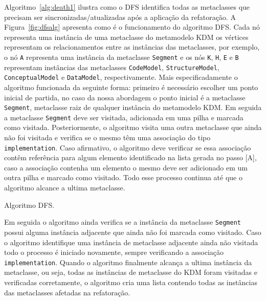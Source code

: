 Algoritmo~\ref{alg:death1} ilustra como o DFS identifica todas as metaclasses que precisam ser sincronizadas/atualizadas após a aplicação da refatoração. A Figura~\ref{fig:dfsalg} apresenta como é o funcionamento do algoritmo DFS. Cada nó representa uma instância de uma metaclasse do metamodelo KDM os vértices representam os relacionamentos entre as instâncias das metaclasses, por exemplo, o nó \texttt{A} representa uma instância da metaclasse \texttt{Segment} e os nós \texttt{K}, \texttt{H}, \texttt{E} e \texttt{B} representam instâncias das metaclasses \texttt{CodeModel}, \texttt{StructureModel}, \texttt{ConceptualModel} e \texttt{DataModel}, respectivamente. Mais especificadamente o algoritmo funcionada da seguinte forma: primeiro é necessário escolher um ponto inicial de partida, no caso da nossa abordagem o ponto inicial é a metaclasse \texttt{Segment}, metaclasse raiz de qualquer instância do metamodelo KDM. Em seguida a metaclasse \texttt{Segment} deve ser visitada, adicionada em uma pilha e marcada como visitada. Posteriormente, o algoritmo visita uma outra metaclasse que ainda não foi visitada e verifica se o mesmo têm uma associação do tipo \texttt{implementation}. Caso afirmativo, o algoritmo deve verificar se essa associação contêm referência para algum elemento identificado na lista gerada no passo [A], caso a associação contenha um elemento o mesmo deve ser adicionado em um outra pilha e marcado como visitado. Todo esse processo continua até que o algoritmo alcance a ultima metaclasse. 



\begin{algoritmo}[h]
     \SetAlgoLined
     \caption{Algoritmo DFS.}
     \label{alg:death1}
   \end{algoritmo}

Em seguida o algoritmo ainda verifica se a instância da metaclasse \texttt{Segment} possui alguma instância adjacente que ainda não foi marcada como visitado. Caso o algoritmo identifique uma instância de metaclasse adjacente ainda não visitada todo o processo é iniciado novamente, sempre verificando a associação \texttt{implementation}. Quando o algoritmo finalmente alcança a ultima instância da metaclasse, ou seja, todas as instâncias de metaclasse do KDM foram visitadas e verificadas corretamente, o algoritmo cria uma lista contendo todas as instâncias das metaclasses afetadas na refatoração. 
   
